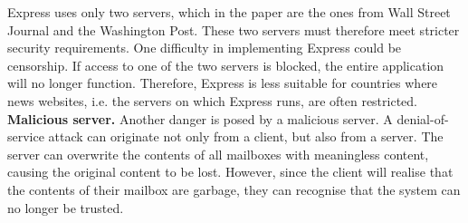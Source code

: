 \documentclass[a4paper]{article}
\begin{document}
Express uses only two servers, which in the paper are the ones from Wall Street Journal and the Washington Post. These two servers must therefore meet stricter security requirements. One difficulty in implementing Express could be censorship. If access to one of the two servers is blocked, the entire application will no longer function.  Therefore, Express is less suitable for countries where news websites, i.e. the servers on which Express runs, are often restricted. 
\\ \textbf{Malicious server.}
Another danger is posed by a malicious server. A denial-of-service attack can originate not only from a client, but also from a server. The server can overwrite the contents of all mailboxes with meaningless content, causing the original content to be lost. However, since the client will realise that the contents of their mailbox are garbage, they can recognise that the system can no longer be trusted. 
\end{document}

